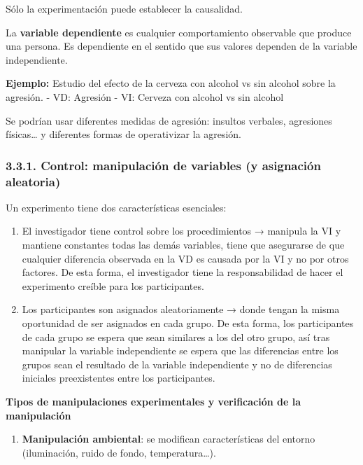 \documentclass[
]{website}
\providecommand{\tightlist}{%
  \setlength{\itemsep}{0pt}\setlength{\parskip}{0pt}}
\begin{document}
Sólo la experimentación puede establecer la causalidad.

La \textbf{variable dependiente} es cualquier comportamiento observable que produce una persona. Es dependiente en el sentido que sus valores dependen de la variable independiente.

\textbf{Ejemplo:} Estudio del efecto de la cerveza con alcohol vs sin alcohol sobre la agresión.
- VD: Agresión
- VI: Cerveza con alcohol vs sin alcohol

Se podrían usar diferentes medidas de agresión: insultos verbales, agresiones físicas\ldots{} y diferentes formas de operativizar la agresión.

\subsubsection*{3.3.1. Control: manipulación de variables (y asignación aleatoria)}\label{subsubtema3_3_1}

Un experimento tiene dos características esenciales:

\begin{enumerate}
\def\labelenumi{\arabic{enumi}.}
\item
  El investigador tiene control sobre los procedimientos → manipula la VI y mantiene constantes todas las demás variables, tiene que asegurarse de que cualquier diferencia observada en la VD es causada por la VI y no por otros factores. De esta forma, el investigador tiene la responsabilidad de hacer el experimento creíble para los participantes.
\item
  Los participantes son asignados aleatoriamente → donde tengan la misma oportunidad de ser asignados en cada grupo. De esta forma, los participantes de cada grupo se espera que sean similares a los del otro grupo, así tras manipular la variable independiente se espera que las diferencias entre los grupos sean el resultado de la variable independiente y no de diferencias iniciales preexistentes entre los participantes.
\end{enumerate}

\textbf{Tipos de manipulaciones experimentales y verificación de la manipulación}

\begin{enumerate}
\def\labelenumi{\arabic{enumi}.}
\tightlist
\item
  \textbf{Manipulación ambiental}: se modifican características del entorno (iluminación, ruido de fondo, temperatura\ldots).
\end{enumerate}
\end{document}
